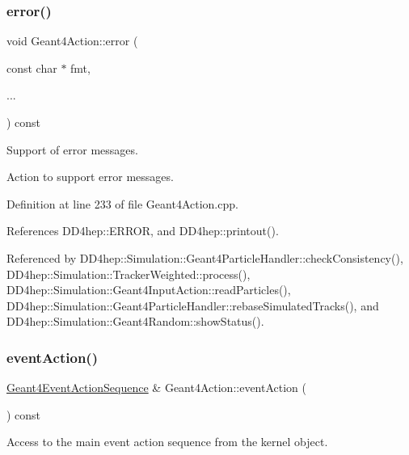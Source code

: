 \subsubsection{\texorpdfstring{error()}{error()}}
{\footnotesize\ttfamily void Geant4\+Action\+::error (\begin{DoxyParamCaption}\item[{const char $\ast$}]{fmt,  }\item[{}]{... }\end{DoxyParamCaption}) const}



Support of error messages. 

Action to support error messages. 

Definition at line 233 of file Geant4\+Action.\+cpp.



References D\+D4hep\+::\+E\+R\+R\+OR, and D\+D4hep\+::printout().



Referenced by D\+D4hep\+::\+Simulation\+::\+Geant4\+Particle\+Handler\+::check\+Consistency(), D\+D4hep\+::\+Simulation\+::\+Tracker\+Weighted\+::process(), D\+D4hep\+::\+Simulation\+::\+Geant4\+Input\+Action\+::read\+Particles(), D\+D4hep\+::\+Simulation\+::\+Geant4\+Particle\+Handler\+::rebase\+Simulated\+Tracks(), and D\+D4hep\+::\+Simulation\+::\+Geant4\+Random\+::show\+Status().

\hypertarget{class_d_d4hep_1_1_simulation_1_1_geant4_action_a57665214b75d7e7682998dcf1d1ef7e2}{}\label{class_d_d4hep_1_1_simulation_1_1_geant4_action_a57665214b75d7e7682998dcf1d1ef7e2} 
\subsubsection{\texorpdfstring{event\+Action()}{eventAction()}}
{\footnotesize\ttfamily \hyperlink{class_d_d4hep_1_1_simulation_1_1_geant4_event_action_sequence}{Geant4\+Event\+Action\+Sequence} \& Geant4\+Action\+::event\+Action (\begin{DoxyParamCaption}{ }\end{DoxyParamCaption}) const}



Access to the main event action sequence from the kernel object. 



